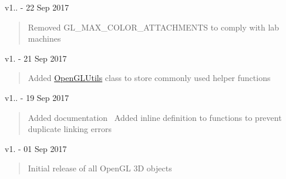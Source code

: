 v1.. -\/ 22 Sep 2017 \begin{quote}
Removed G\+L\+\_\+\+M\+A\+X\+\_\+\+C\+O\+L\+O\+R\+\_\+\+A\+T\+T\+A\+C\+H\+M\+E\+N\+TS to comply with lab machines \end{quote}


v1. -\/ 21 Sep 2017 \begin{quote}
Added \hyperlink{namespace_open_g_l_utils}{Open\+G\+L\+Utils} class to store commonly used helper functions \end{quote}


v1.. -\/ 19 Sep 2017 \begin{quote}
Added documentation~\newline
Added inline definition to functions to prevent duplicate linking errors \end{quote}


v1. -\/ 01 Sep 2017 \begin{quote}
Initial release of all Open\+GL 3D objects\end{quote}
